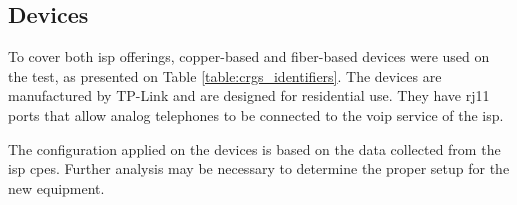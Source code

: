 \subsection{Devices}

To cover both \gls{isp} offerings, copper-based and fiber-based devices were used on the test, as presented on Table \ref{table:crgs_identifiers}. The devices are manufactured by TP-Link and are designed for residential use. They have \gls{rj11} ports that allow analog telephones to be connected to the \gls{voip} service of the \gls{isp}.

\begin{table}[h]
    \caption{Identifiers of the \gls{crg}s}
    \label{table:crgs_identifiers}
\end{table}

The configuration applied on the devices is based on the data collected from the \gls{isp} \gls{cpe}s. Further analysis may be necessary to determine the proper setup for the new equipment.

\FloatBarrier
